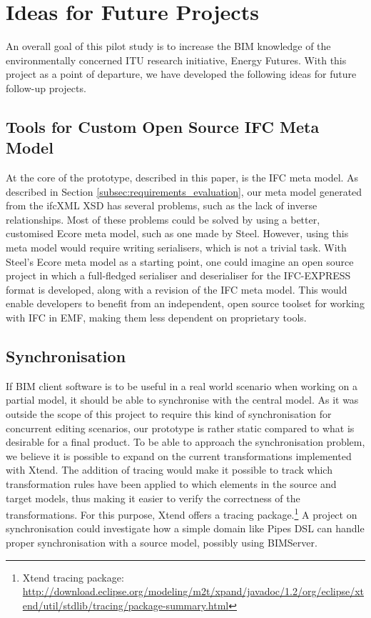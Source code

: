 
\section{Ideas for Future Projects}
\label{sec:plan_for_future_projects}
An overall goal of this pilot study is to increase the BIM knowledge of the environmentally concerned ITU research initiative, Energy Futures. With this project as a point of departure, we have developed the following ideas for future follow-up projects.

\subsection{Tools for Custom Open Source IFC Meta Model}
At the core of the prototype, described in this paper, is the IFC meta model. As described in Section \ref{subsec:requirements_evaluation}, our meta model generated from the ifcXML XSD has several problems, such as the lack of inverse relationships. Most of these problems could be solved by using a better, customised Ecore meta model, such as one made by Steel. However, using this meta model would require writing serialisers, which is not a trivial task. With Steel's Ecore meta model as a starting point, one could imagine an open source project in which a full-fledged serialiser and deserialiser for the IFC-EXPRESS format is developed, along with a revision of the IFC meta model. This would enable developers to benefit from an independent, open source toolset for working with IFC in EMF, making them less dependent on proprietary tools.

\subsection{Synchronisation}
If BIM client software is to be useful in a real world scenario when working on a partial model, it should be able to synchronise with the central model. As it was outside the scope of this project to require this kind of synchronisation for concurrent editing scenarios, our prototype is rather static compared to what is desirable for a final product. To be able to approach the synchronisation problem, we believe it is possible to expand on the current transformations implemented with Xtend. The addition of tracing would make it possible to track which transformation rules have been applied to which elements in the source and target models, thus making it easier to verify the correctness of the transformations. For this purpose, Xtend offers a tracing package.\footnote{Xtend tracing package: \url{http://download.eclipse.org/modeling/m2t/xpand/javadoc/1.2/org/eclipse/xtend/util/stdlib/tracing/package-summary.html}} A project on synchronisation could investigate how a simple domain like Pipes DSL can handle proper synchronisation with a source model, possibly using BIMServer.

